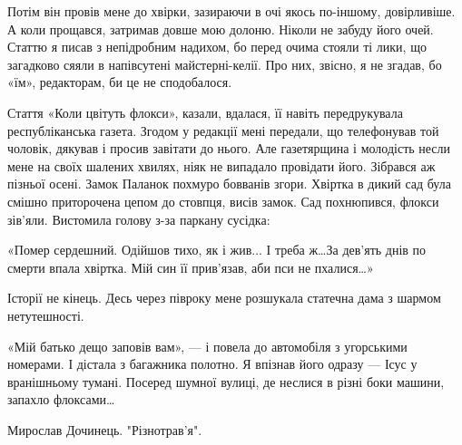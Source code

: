 Потім він провів мене до хвірки, зазираючи в очі якось по-іншому, довірливіше.
А коли прощався, затримав довше мою долоню. Ніколи не забуду його очей. Статтю
я писав з непідробним надихом, бо перед очима стояли ті лики, що загадково
сяяли в напівсутені майстерні-келії. Про них, звісно, я не згадав, бо «їм»,
редакторам, би це не сподобалося.

Стаття «Коли цвітуть флокси», казали, вдалася, її навіть передрукувала
республіканська газета. Згодом у редакції мені передали, що телефонував той
чоловік, дякував і просив завітати до нього. Але газетярщина і молодість несли
мене на своїх шалених хвилях, ніяк не випадало провідати його. Зібрався аж
пізньої осені. Замок Паланок похмуро бовванів згори. Хвіртка в дикий сад була
смішно приторочена цепом до стовпця, висів замок. Сад похнюпився, флокси
зів’яли. Вистомила голову з-за паркану сусідка:

«Помер сердешний. Одійшов тихо, як і жив... І треба ж…За дев’ять днів по
смерти впала хвіртка. Мій син її прив’язав, аби пси не пхалися…»

 Історії не кінець. Десь через півроку мене розшукала статечна дама з шармом
 нетутешності.

«Мій батько дещо заповів вам», --- і повела до автомобіля з угорськими номерами.
І дістала з багажника полотно. Я впізнав його одразу --- Ісус у вранішньому
тумані. Посеред шумної вулиці, де неслися в різні боки машини, запахло
флоксами…

Мирослав Дочинець. "Різнотрав'я".
